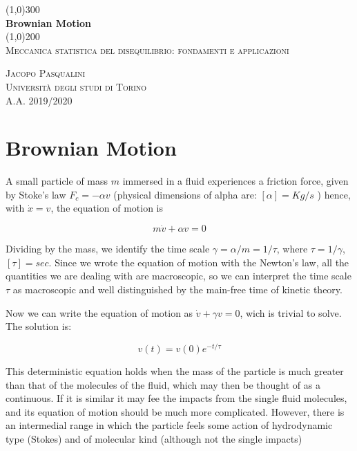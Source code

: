 \documentclass{article}
\begin{document}
\begin{titlepage}
	\begin{center}
	
	\line(1,0){300}\\
	[5mm]
	\huge{\bfseries Brownian Motion}\\
	[2mm]
	\line(1,0){200}\\
	[2cm]
	\textsc{\Large Meccanica statistica del disequilibrio: fondamenti e applicazioni} \\
	[8cm]
	
	\end{center}
	
	\begin{flushright}
	\textsc{\LARGE Jacopo Pasqualini}\\
	[0.5cm]
	\textsc{\large Università degli studi di Torino\\
	[0.5cm]
	A.A. 2019/2020 }
	\end{flushright}
	
\end{titlepage}

\section{Brownian Motion}\label{sec:bromot}

A small particle of mass $m$ immersed in a fluid experiences a friction force, given by Stoke's law $F_{c} = - \alpha v$ (physical dimensions of alpha are: $[\alpha] = Kg/s$ ) hence, with $\dot{x}=v$, the equation of motion is

\begin{equation}
m\dot{v}+\alpha v = 0
\end{equation}

Dividing by the mass, we identify the time scale $\gamma = \alpha/m=1/ \tau$, where $ \tau = 1/ \gamma$, $[\tau]=sec$. Since we wrote the equation of motion with the Newton's law, all the quantities we are dealing with are macroscopic, so we can interpret the time scale $\tau$ as macroscopic and well distinguished by the main-free time of kinetic theory.

Now we can write the equation of motion as $\dot{v}+\gamma v = 0$, wich is trivial to solve. The solution is:

\begin{equation}
v(t)=v(0)  e^{-t/ \tau}
\end{equation}

This deterministic equation holds when the mass of the particle is much greater than that of the molecules of the fluid, which may then be thought of as a continuous. If it is similar it may fee the impacts from the single fluid molecules, and its equation of motion should be much more complicated. However, there is an intermedial range in which the particle feels some action of hydrodynamic type (Stokes) and of molecular kind (although not the single impacts)
\end{document}
